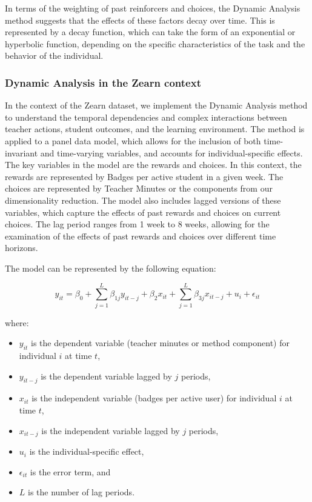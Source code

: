 \documentclass[
  number,
  preprint,
  3p,
  onecolumn]{elsarticle}
\providecommand{\tightlist}{%
  \setlength{\itemsep}{0pt}\setlength{\parskip}{0pt}}\usepackage{longtable,booktabs,array}
\begin{document}
In terms of the weighting of past reinforcers and choices, the Dynamic
Analysis method suggests that the effects of these factors decay over
time. This is represented by a decay function, which can take the form
of an exponential or hyperbolic function, depending on the specific
characteristics of the task and the behavior of the individual.

\hypertarget{dynamic-analysis-in-the-zearn-context}{%
\subsubsection{Dynamic Analysis in the Zearn
context}\label{dynamic-analysis-in-the-zearn-context}}

In the context of the Zearn dataset, we implement the Dynamic Analysis
method to understand the temporal dependencies and complex interactions
between teacher actions, student outcomes, and the learning environment.
The method is applied to a panel data model, which allows for the
inclusion of both time-invariant and time-varying variables, and
accounts for individual-specific effects. The key variables in the model
are the rewards and choices. In this context, the rewards are
represented by Badges per active student in a given week. The choices
are represented by Teacher Minutes or the components from our
dimensionality reduction. The model also includes lagged versions of
these variables, which capture the effects of past rewards and choices
on current choices. The lag period ranges from 1 week to 8 weeks,
allowing for the examination of the effects of past rewards and choices
over different time horizons.

The model can be represented by the following equation:

\[
y_{it} = \beta_0 + \sum_{j=1}^{L} \beta_{1j} y_{it-j} + \beta_2 x_{it} + \sum_{j=1}^{L} \beta_{3j} x_{it-j} + u_i + \epsilon_{it}
\]

where:

\begin{itemize}
\tightlist
\item
  \(y_{it}\) is the dependent variable (teacher minutes or method
  component) for individual \(i\) at time \(t\),
\item
  \(y_{i t-j}\) is the dependent variable lagged by \(j\) periods,
\item
  \(x_{it}\) is the independent variable (badges per active user) for
  individual \(i\) at time \(t\),
\item
  \(x_{i t-j}\) is the independent variable lagged by \(j\) periods,
\item
  \(u_i\) is the individual-specific effect,
\item
  \(\epsilon_{it}\) is the error term, and
\item
  \(L\) is the number of lag periods.
\end{itemize}
\end{document}
